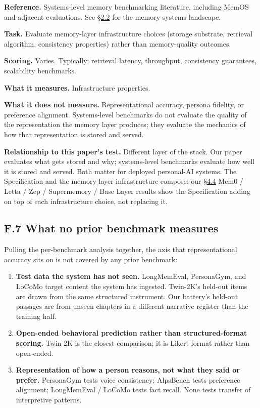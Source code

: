 \textbf{Reference.} Systems-level memory benchmarking literature,
including MemOS and adjacent evaluations. See \hyperref[memory-systems-for-llm-agents]{§2.2} for the
memory-systems landscape.

\textbf{Task.} Evaluate memory-layer infrastructure choices (storage
substrate, retrieval algorithm, consistency properties) rather than
memory-quality outcomes.

\textbf{Scoring.} Varies. Typically: retrieval latency, throughput,
consistency guarantees, scalability benchmarks.

\textbf{What it measures.} Infrastructure properties.

\textbf{What it does not measure.} Representational accuracy, persona
fidelity, or preference alignment. Systems-level benchmarks do not
evaluate the quality of the representation the memory layer produces;
they evaluate the mechanics of how that representation is stored and
served.

\textbf{Relationship to this paper's test.} Different layer of the
stack. Our paper evaluates what gets stored and why; systems-level
benchmarks evaluate how well it is stored and served. Both matter for
deployed personal-AI systems. The Specification and the memory-layer
infrastructure compose: our \hyperref[memory-system-composition]{§4.4} Mem0 / Letta / Zep / Supermemory / Base
Layer results show the Specification adding on top of each
infrastructure choice, not replacing it.

\hypertarget{f.7-what-no-prior-benchmark-measures}{%
\subsection{F.7 What no prior benchmark
measures}\label{f.7-what-no-prior-benchmark-measures}}

Pulling the per-benchmark analysis together, the axis that
representational accuracy sits on is not covered by any prior benchmark:

\begin{enumerate}
\def\labelenumi{\arabic{enumi}.}
\tightlist
\item
  \textbf{Test data the system has not seen.} LongMemEval, PersonaGym,
  and LoCoMo target content the system has ingested. Twin-2K's held-out
  items are drawn from the same structured instrument. Our battery's
  held-out passages are from unseen chapters in a different narrative
  register than the training half.
\item
  \textbf{Open-ended behavioral prediction rather than structured-format
  scoring.} Twin-2K is the closest comparison; it is Likert-format
  rather than open-ended.
\item
  \textbf{Representation of how a person reasons, not what they said or
  prefer.} PersonaGym tests voice consistency; AlpsBench tests
  preference alignment; LongMemEval / LoCoMo tests fact recall. None
  tests transfer of interpretive patterns.
\end{enumerate}

